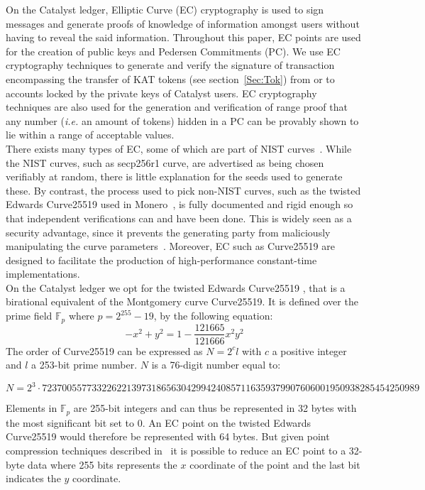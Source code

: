 On the Catalyst ledger, Elliptic Curve (EC) cryptography is used to sign messages and generate proofs of knowledge of information amongst users without having to reveal the said information. Throughout this paper, EC points are used for the creation of public keys and Pedersen Commitments (PC). We use EC cryptography techniques to generate and verify the signature of transaction encompassing the transfer of KAT tokens (see section~\ref{Sec:Tok}) from or to accounts locked by the private keys of Catalyst users. EC cryptography techniques are also used for the generation and verification of range proof that any number (\textit{i.e.} an amount of tokens) hidden in a PC can be provably shown to lie within a range of acceptable values.\\
 
There exists many types of EC, some of which are part of NIST curves~\cite{Hankerson2011}. While the NIST curves, such as secp256r1 curve, are advertised as being chosen verifiably at random, there is little explanation for the seeds used to generate these. By contrast, the process used to pick non-NIST curves, such as the twisted Edwards Curve25519 used in Monero~\cite{monero}, is fully documented and rigid enough so that independent verifications can and have been done. This is widely seen as a security advantage, since it prevents the generating party from maliciously manipulating the curve parameters~\cite{NSA}. Moreover, EC such as Curve25519 are designed to facilitate the production of high-performance constant-time implementations. \\

On the Catalyst ledger we opt for the twisted Edwards Curve25519 \cite{ed25519}, that is a birational equivalent of the Montgomery curve Curve25519. It is defined over the prime field $\mathbb{F}_{p}$ where $p = 2^{255} - 19$, by the following equation:
\begin{equation}
-x^2+y^2=1-\frac{121665}{121666}x^2y^2
\end{equation}
The order of Curve25519 can be expressed as $N=2^cl$ with $c$ a positive integer and $l$ a 253-bit prime number. $N$ is a 76-digit number equal to:
\begin{center}
\begin{footnotesize}
$N=2^3\cdot 7237005577332262213973186563042994240857116359379907606001950938285454250989$
\end{footnotesize}
\end{center}

Elements in $\mathbb{F}_{p}$ are 255-bit integers and can thus be represented in 32 bytes with the most significant bit set to 0. An EC point on the twisted Edwards Curve25519 would therefore be represented with 64 bytes. But given point compression techniques described in~\cite{monero} it is possible to reduce an EC point to a 32-byte data where 255 bits represents the $x$ coordinate of the point and the last bit indicates the $y$ coordinate. \\


